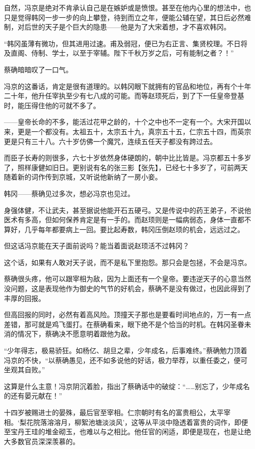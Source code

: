 自然，冯京是绝对不肯承认自己是在嫉妒或是愤恨。甚至在他内心里的想法中，也只是觉得韩冈一步一步的向上攀登，待到而立之年，便能公辅在望，其日后必然难制，对后世的天子是个巨大的隐患——他是为了大宋着想，才不喜欢韩冈。

“韩冈虽薄有微功，但其进用过速。甫及弱冠，便已为右正言、集贤校理。不日将及直阁、侍制、学士，以至于宰辅。陛下千秋万岁之后，可有能制之者？！”

蔡确暗暗叹了一口气。

冯京的这番话，肯定是很有道理的。以韩冈眼下就拥有的官品和地位，再有个十年二十年，他升任宰执至少有七八成的可能。而等赵顼死后，到了下一任皇帝登基时，能压得住他的可就不多了。

——皇帝长命的不多，能活过花甲之龄的，十个之中也不一定有一个。大宋开国以来，更是一个都没有。太祖五十，太宗五十九，真宗五十五，仁宗五十四，而英宗更是只有三十八。六十岁仿佛一个魔咒，连续五任天子都没有跨过去。

而臣子长寿的则很多，六七十岁依然身体硬朗的，朝中比比皆是。冯京都五十多岁了，照样康健如旧日。更别说有名的张三影【张先】，已经七十多岁了，可前两天随着新的词作传到京城，又听说他新纳了一房小妾。

韩冈——蔡确见过多次，想必冯京也见过。

身强体健，不让武夫，甚至据说他能开石五硬弓。又是传说中的药王弟子，不说他医术有多高，但如何保养肯定是有一手的。而赵顼则是一幅病弱态，身体一直都不算好，几乎每年都要病上一回。要比起寿数，韩冈压倒赵顼的机会，远远过之。

但这话冯京能在天子面前说吗？能当着面说赵顼活不过韩冈？

这个话，如果有人敢对天子说，而不是私下里抱怨。那只会是包拯，不会是冯京。

蔡确很头疼，他可以跟宰相为敌，因为上面还有一个皇帝。要违逆天子的心意当然没问题，这是表现他作为御史的气节的好机会，蔡确不是没有做过，也因此得到了丰厚的回报。

但高回报的同时，必然有着高风险。顶撞天子那也是要看时间地点的，万一有一点差错，那可就是鸡飞蛋打。在蔡确看来，眼下绝不是个恰当的时机。在韩冈圣眷未消的情况下，蔡确决不愿意明着跟他为敌。

“少年得志，极易骄狂。如杨亿、胡旦之辈，少年成名，后事难终。”蔡确勉力顶着冯京的不快，“以蔡确愚见，还不如多说他的好话，极力举荐，以重任委之，便可坐观其自败。”

这算是什么主意！冯京阴沉着脸，指出了蔡确话中的破绽：“……别忘了，少年成名的还有晏元献在！”

十四岁被赐进士的晏殊，最后官至宰相。仁宗朝时有名的富贵相公，太平宰相。‘梨花院落溶溶月，柳絮池塘淡淡风’，这等从平淡中隐透着富贵的词作，即便至宝丹王珪的堆金砌玉，也难以与之相比。他任官的闲适，即便是现在，也是让绝大多数官员深深羡慕的。

